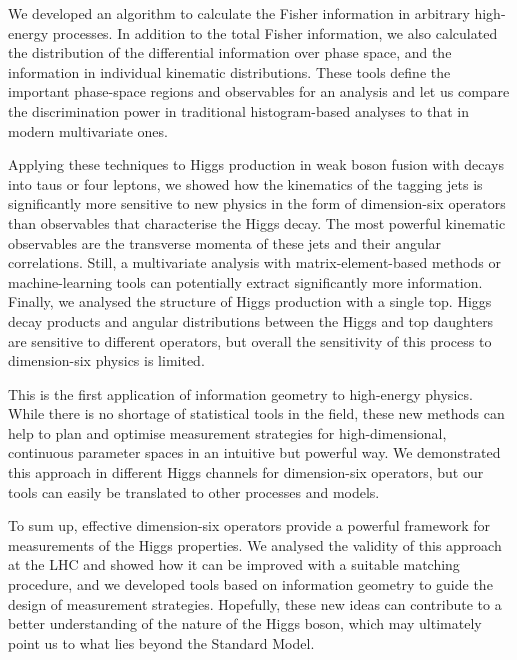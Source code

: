 We developed an algorithm to calculate the Fisher information in
arbitrary high-energy processes. In addition to the total Fisher
information, we also calculated the distribution of the differential
information over phase space, and the information in individual
kinematic distributions. These tools define the important phase-space
regions and observables for an analysis and let us compare the
discrimination power in traditional histogram-based analyses to that
in modern multivariate ones.

Applying these techniques to Higgs production in weak boson fusion
with decays into taus or four leptons, we showed how the kinematics of
the tagging jets is significantly more sensitive to new physics in the
form of dimension-six operators than observables that characterise the
Higgs decay. The most powerful kinematic observables are the
transverse momenta of these jets and their angular correlations. Still, a
multivariate analysis with matrix-element-based methods or
machine-learning tools can potentially extract significantly more
information. Finally, we analysed the structure of Higgs production
with a single top. Higgs decay products and angular distributions
between the Higgs and top daughters are sensitive to different
operators, but overall the sensitivity of this process to
dimension-six physics is limited.

This is the first application of information geometry to high-energy
physics. While there is no shortage of statistical tools in the field,
these new methods can help to plan and optimise measurement strategies
for high-dimensional, continuous parameter spaces in an intuitive but
powerful way. We demonstrated this approach in different Higgs
channels for dimension-six operators, but our tools can easily be
translated to other processes and models.

\newparagraph
%
To sum up, effective dimension-six operators provide a powerful
framework for measurements of the Higgs properties. We analysed the
validity of this approach at the LHC and showed how it can be improved
with a suitable matching procedure, and we developed tools based on
information geometry to guide the design of measurement
strategies. Hopefully, these new ideas can contribute to a better
understanding of the nature of the Higgs boson, which may ultimately
point us to what lies beyond the Standard Model.
